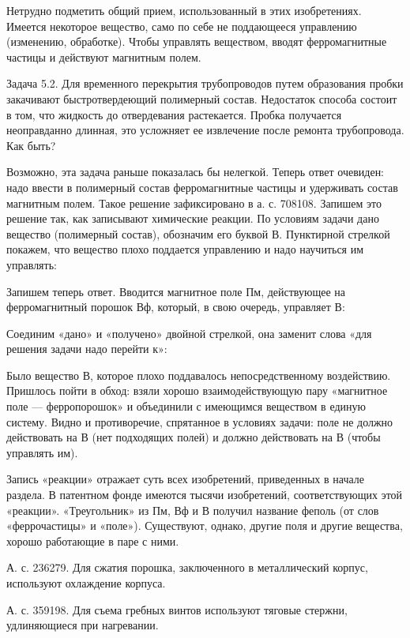 Нетрудно подметить  общий прием,  использованный в  этих изобретениях.
Имеется   некоторое   вещество,   само    по   себе   не   поддающееся
управлению (изменению,  обработке). Чтобы управлять  веществом, вводят
ферромагнитные частицы и действуют магнитным полем.

Задача 5.2. Для временного  перекрытия трубопроводов путем образования
пробки  закачивают  быстротвердеющий   полимерный  состав.  Недостаток
способа  состоит  в том,  что  жидкость  до отвердевания  растекается.
Пробка получается  неоправданно длинная,  это усложняет  ее извлечение
после ремонта трубопровода. Как быть?

Возможно,  эта  задача раньше  показалась  бы  нелегкой. Теперь  ответ
очевиден:  надо ввести  в полимерный  состав ферромагнитные  частицы и
удерживать состав магнитным полем. Такое решение зафиксировано в а. с.
708108. Запишем это решение так, как записывают химические реакции. По
условиям  задачи  дано  вещество (полимерный  состав),  обозначим  его
буквой В.  Пунктирной стрелкой  покажем, что вещество  плохо поддается
управлению и надо научиться им управлять:


Запишем  теперь  ответ. Вводится  магнитное  поле  Пм, действующее  на
ферромагнитный порошок Вф, который, в свою очередь, управляет В:


Соединим «дано» и «получено» двойной  стрелкой, она заменит слова «для
решения задачи надо перейти к»:


Было   вещество  В,   которое   плохо  поддавалось   непосредственному
воздействию. Пришлось  пойти в  обход: взяли  хорошо взаимодействующую
пару  «магнитное  поле  —   ферропорошок»  и  объединили  с  имеющимся
веществом  в  единую  систему.  Видно  и  противоречие,  спрятанное  в
условиях  задачи: поле  не  должно действовать  на  В (нет  подходящих
полей) и должно действовать на В (чтобы управлять им).

Запись «реакции» отражает суть  всех изобретений, приведенных в начале
раздела. В патентном фонде имеются тысячи изобретений, соответствующих
этой «реакции».  «Треугольник» из Пм,  Вф и В получил  название феполь
(от слов «феррочастицы»  и «поле»). Существуют, однако,  другие поля и
другие вещества, хорошо работающие в паре с ними.


А. с. 236279. Для сжатия порошка, заключенного в металлический корпус,
используют охлаждение корпуса.

А. с.  359198. Для  съема гребных  винтов используют  тяговые стержни,
удлиняющиеся при нагревании.

